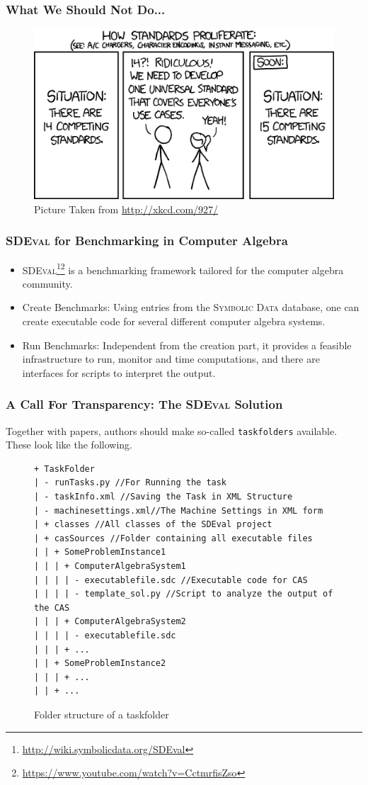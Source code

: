 \documentclass{beamer}
\begin{document}
\begin{frame}
\frametitle{What We Should Not Do...}
\begin{figure}
\includegraphics[width=.7\textwidth]{pics/standards.png}
\caption{Picture Taken from \url{http://xkcd.com/927/}}
\end{figure}
\end{frame}

\begin{frame}
\frametitle{\textsc{SDEval} for Benchmarking in Computer Algebra}
\begin{itemize}
\item
  \textsc{SDEval}\footnote{\url{http://wiki.symbolicdata.org/SDEval}}\footnote{\url{https://www.youtube.com/watch?v=CctmrfisZso}}
  is a benchmarking framework tailored for the computer algebra community.
\item Create Benchmarks: Using entries from the \textsc{Symbolic Data}
  database, one can create executable code for several different
  computer algebra systems.
\item Run Benchmarks: \alert<2->{Independent from the creation part}, it provides
  a feasible infrastructure to run, monitor and time computations, and
  there are interfaces for scripts to interpret the output.
\end{itemize}
\end{frame}

\begin{frame}[fragile]
  \frametitle{A Call For Transparency: The \textsc{SDEval} Solution}
  Together with papers, authors should make so-called
  \texttt{taskfolders} available. These look like the following.
\begin{figure}
{\scriptsize{
\begin{verbatim}
+ TaskFolder 
| - runTasks.py //For Running the task
| - taskInfo.xml //Saving the Task in XML Structure
| - machinesettings.xml//The Machine Settings in XML form 
| + classes //All classes of the SDEval project
| + casSources //Folder containing all executable files
| | + SomeProblemInstance1 
| | | + ComputerAlgebraSystem1
| | | | - executablefile.sdc //Executable code for CAS
| | | | - template_sol.py //Script to analyze the output of the CAS
| | | + ComputerAlgebraSystem2
| | | | - executablefile.sdc
| | | + ...
| | + SomeProblemInstance2
| | | + ...
| | + ...
\end{verbatim}}}
\caption{Folder structure of a taskfolder}
\label{fgr:TaskFolder}

\end{figure}
\end{frame}
\end{document}
